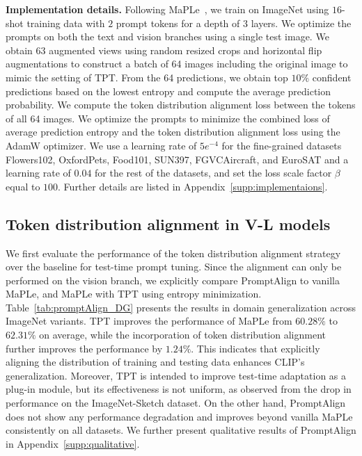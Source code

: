 \documentclass[a4paper]{article}
\begin{document}
\textbf{Implementation details.}
Following MaPLe~\cite{khattakMaPLe}, we train on ImageNet using $16$-shot training data with $2$ prompt tokens for a depth of $3$ layers. We optimize the prompts on both the text and vision branches using a single test image. We obtain 63 augmented views using random resized crops and horizontal flip augmentations to construct a batch of 64 images including the original image to mimic the setting of TPT. From the 64 predictions, we obtain top $10\%$ confident predictions based on the lowest entropy and compute the average prediction probability. We compute the token distribution alignment loss between the tokens of all 64 images. We optimize the prompts to minimize the combined loss of average prediction entropy and the token distribution alignment loss using the AdamW optimizer. We use a learning rate of $5e^{-4}$ for the fine-grained datasets Flowers102, OxfordPets, Food101, SUN397, FGVCAircraft, and EuroSAT and a learning rate of $0.04$ for the rest of the datasets, and set the loss scale factor $\beta$ equal to $100$. Further details are listed in Appendix~\ref{supp:implementaions}.


\subsection{Token distribution alignment in V-L models}

We first evaluate the performance of the token distribution alignment strategy over the baseline for test-time prompt tuning. Since the alignment can only be performed on the vision branch, we explicitly compare PromptAlign to vanilla MaPLe, and MaPLe with TPT using entropy minimization. Table~\ref{tab:promptAlign_DG} presents the results in domain generalization across ImageNet variants. TPT improves the performance of MaPLe from $60.28\%$ to $62.31\%$ on average, while the incorporation of token distribution alignment further improves the performance by $1.24\%$. This indicates that explicitly aligning the distribution of training and testing data enhances CLIP's generalization. Moreover, TPT is intended to improve test-time adaptation as a plug-in module, but its effectiveness is not uniform, as observed from the drop in performance on the ImageNet-Sketch dataset. On the other hand, PromptAlign does not show any performance degradation and improves beyond vanilla MaPLe consistently on all datasets. We further present qualitative results of PromptAlign in Appendix~\ref{supp:qualitative}. \par
\end{document}
